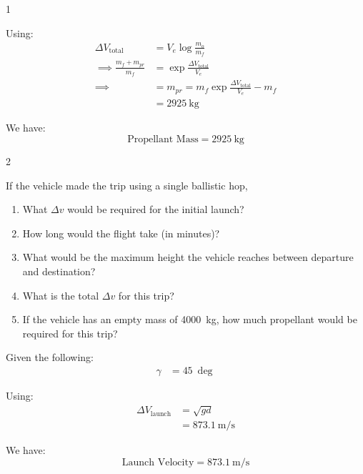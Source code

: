 \begin{hwkProblem*}{1}{}
	\hwkPart{} \label{hwk:s01d}

	Using:
	\begin{align*}
		\Delta V_{\text{total}} &= V_{e} \log{\frac{m_{o}}{m_{f}}} \\
		\implies \frac{m_{f} + m_{pr}}{m_{f}} &= \exp{\frac{\Delta V_{\text{total}}}{V_{e}}} \\
		\implies &= m_{pr} = m_{f} \exp{\frac{\Delta V_{\text{total}}}{V_{e}}} - m_{f} \\
		\, &= \qty{2925}{\kg}
	\end{align*}

	We have:
	\[
		\boxed{\text{Propellant Mass} = \qty{2925}{\kg}}
	\]

\end{hwkProblem*}

\begin{hwkProblem*}{2}{} \label{hwk:p02}

	If the vehicle made the trip using a single ballistic hop,
	\begin{enumerate}[label=\alph*.]
		\item \label{hwk:p02a} What \( \Delta v \) would be required for the initial launch?
		\item \label{hwk:p02b} How long would the flight take (in minutes)?
		\item \label{hwk:p02c} What would be the maximum height the vehicle reaches between departure and destination?
		\item \label{hwk:p02d} What is the total \( \Delta v \) for this trip?
		\item \label{hwk:p02e} If the vehicle has an empty mass of \qty{4000}{\kg}, how much propellant would be required for this trip?
	\end{enumerate}

	\hwkSol{} \label{hwk:s02}

	Given the following:
	\begin{align*}
		\gamma &= \qty{45}{\deg}
	\end{align*}

	\hwkPart{} \label{hwk:s02a}

	Using:
	\begin{align*}
		\Delta V_{\text{launch}} &= \sqrt{g d} \\
		\, &= \qty{873.1}{\m\per\s}
	\end{align*}

	We have:
	\[
		\boxed{\text{Launch Velocity} = \qty{873.1}{\m\per\s}}
	\]

	\hwkPart{} \label{hwk:s02b}


\end{hwkProblem*}
